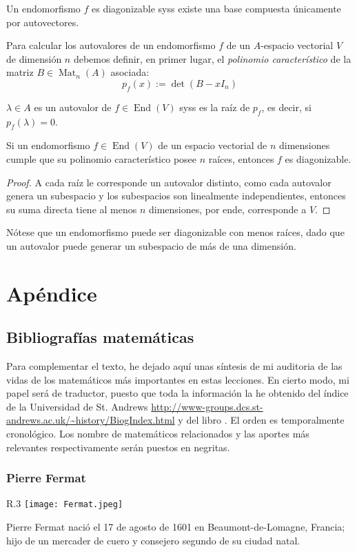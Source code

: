 \documentclass[11pt,oneside]{book}
\DeclareMathOperator{\Mat}{Mat}
\DeclareMathOperator{\End}{End}
\begin{document}
\begin{thm}
Un endomorfismo $f$ es diagonizable syss existe una base compuesta únicamente por autovectores.
\end{thm}
Para calcular los autovalores de un endomorfismo $f$ de un $A$-espacio vectorial $V$ de dimensión $n$ debemos definir, en primer lugar, el \textit{polinomio característico} de la matriz $B\in\Mat_n(A)$ asociada:
\begin{equation}
p_f(x):=\det(B-xI_n)
\end{equation} 
\begin{lem}
$\lambda\in A$ es un autovalor de $f\in\End(V)$ syss es la raíz de $p_f$, es decir, si $p_f(\lambda)=0$.
\end{lem}
\begin{thm}
Si un endomorfismo $f\in\End(V)$ de un espacio vectorial de $n$ dimensiones cumple que su polinomio característico posee $n$ raíces, entonces $f$ es diagonizable.
\end{thm}
\begin{proof}
A cada raíz le corresponde un autovalor distinto, como cada autovalor genera un subespacio y los subespacios son linealmente independientes, entonces su suma directa tiene al menos $n$ dimensiones, por ende, corresponde a $V$.
\end{proof}
Nótese que un endomorfismo puede ser diagonizable con menos raíces, dado que un autovalor puede generar un subespacio de más de una dimensión.

\appendix
\part*{Apéndice}
\chapter{Bibliografías matemáticas}
Para complementar el texto, he dejado aquí unas síntesis de mi auditoria de las vidas de los matemáticos más importantes en estas lecciones. En cierto modo, mi papel será de traductor, puesto que toda la información la he obtenido del índice de la Universidad de St. Andrews \url{http://www-groups.dcs.st-andrews.ac.uk/~history/BiogIndex.html} y del libro \cite{temple1986men}. El orden es temporalmente cronológico. Los nombre de matemáticos relacionados y las aportes más relevantes respectivamente serán puestos en negritas.

\section{Pierre Fermat}
\begin{wrapfigure}{R}{.3\textwidth}
\texttt{[image: Fermat.jpeg]}
\caption{}
\end{wrapfigure}
Pierre Fermat nació el 17 de agosto de 1601 en Beaumont-de-Lomagne, Francia; hijo de un mercader de cuero y consejero segundo de su ciudad natal.
\end{document}
